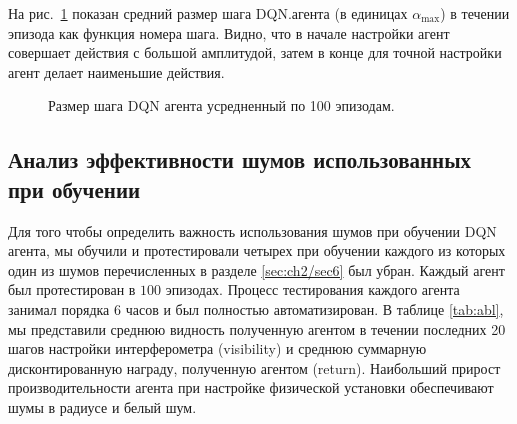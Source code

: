 На рис.~\ref{fig:step_size} показан средний размер шага DQN.агента (в единицах $\alpha_{\max}$) в течении эпизода как функция номера шага. Видно, что в начале настройки агент совершает действия с большой амплитудой, затем в конце для точной настройки агент делает наименьшие действия. 

\begin{figure}[ht]
\caption{Размер шага DQN агента усредненный по 100 эпизодам.}
\label{fig:step_size}
\end{figure}

\subsection{Анализ эффективности шумов использованных при обучении}

Для того чтобы определить важность использования шумов при обучении DQN агента, мы обучили и протестировали четырех при обучении каждого из которых один из шумов перечисленных в разделе \ref{sec:ch2/sec6} был убран. Каждый агент был протестирован в $100$ эпизодах. Процесс тестирования каждого агента занимал порядка 6 часов и был полностью автоматизирован. В таблице \ref{tab:abl}, мы представили среднюю видность полученную агентом в течении последних 20 шагов настройки интерферометра (visibility) и среднюю суммарную дисконтированную награду, полученную агентом (return). Наибольший прирост производительности агента при настройке физической установки обеспечивают шумы в радиусе и белый шум. 

